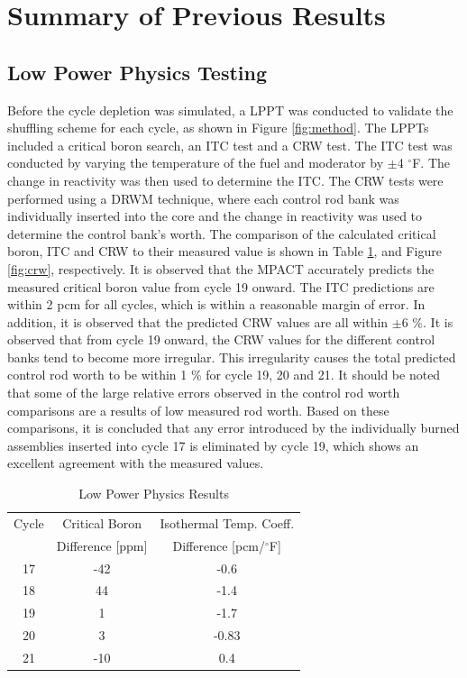 \documentclass[edeposit,fullpage,12pt]{uiucthesis2009}
\begin{document}
\section{Summary of Previous Results}

\subsection{Low Power Physics Testing}
Before the cycle depletion was simulated, a \gls{LPPT} was conducted to validate the shuffling scheme for each cycle, as shown in Figure \ref{fig:method}.
The \gls{LPPT}s included a critical boron search, an \gls{ITC} test and a \gls{CRW} test. 
The \gls{ITC} test was conducted by varying the temperature of the fuel and moderator by $\pm$4 $^\circ$F. 
The change in reactivity was then used to determine the \gls{ITC}. 
The \gls{CRW} tests were performed using a \gls{DRWM} technique, where each control rod bank was individually inserted into the core and the change in reactivity was used to determine the control bank's worth. 
The comparison of the calculated critical boron, \gls{ITC} and \gls{CRW} to their measured value is shown in Table \ref{tab:cb}, and Figure \ref{fig:crw}, respectively. 
It is observed that the MPACT accurately predicts the measured critical boron value from cycle 19 onward.
The \gls{ITC} predictions are within 2 pcm for all cycles, which is within a reasonable margin of error.
In addition, it is observed that the predicted \gls{CRW} values are all within $\pm6$ \%.
It is observed that from cycle 19 onward, the \gls{CRW} values for the different control banks tend to become more irregular.
This irregularity causes the total predicted control rod worth to be within 1 \% for cycle 19, 20 and 21. 
It should be noted that some of the large relative errors observed in the control rod worth comparisons are a results of low measured rod worth. 
Based on these comparisons, it is concluded that any error introduced by the individually burned assemblies inserted into cycle 17 is eliminated by cycle 19, which shows an excellent agreement with the measured values. 

\begin{table}
\caption{Low Power Physics Results}
\label{tab:cb}
\begin{center}
\begin{tabular}[!t]{|c|c|c|}
\hline
Cycle      & Critical Boron   & Isothermal Temp. Coeff.      \\
           & Difference [ppm] & Difference [pcm/$^{\circ}$F]  \\ \hline
17 & -42 & -0.6     \\\hline
18 & 44  & -1.4     \\\hline
19 & 1   & -1.7     \\\hline
20 & 3 & -0.83     \\\hline
21 & -10 & 0.4     \\\hline
\end{tabular}
\end{center}
\end{table}
\end{document}
